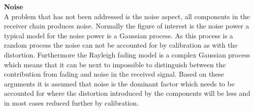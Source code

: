 %
%
%
\textbf{Noise}\\
A problem that has not been addressed is the noise aspect, all components in the receiver chain produces noise. Normally the figure of interest is the noise power a typical model for the noise power is a Gaussian process. As this process is a random process the noise can not be accounted for by calibration as with the distortion. Furthermore the Rayleigh fading model is a complex Gaussian process which means that it can be next to impossible to distinguish between the contribution from fading and noise in the received signal. Based on these arguments it is assumed that noise is the dominant factor which needs to be accounted for where the distortion introduced by the components will be less and in most cases reduced further by calibration.


